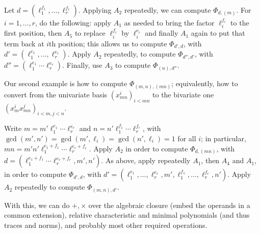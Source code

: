 \documentclass[12pt]{article}
\begin{document}
Let $d=(\ell_1^{f_1},\dots,\ell_r^{f_r})$. Applying $A_2$ repeatedly,
we can compute $\Phi_{d,(m)}$. For $i=1,\dots,r$, do the following:
apply $A_1$ as needed to bring the factor $\ell_i^{f_i}$ to the first
position, then $A_5$ to replace $\ell_i^{f_i}$ by $\ell_i^{e_i}$ and
finally $A_1$ again to put that term back at $i$th position; this
allows us to compute $\Phi_{d',d}$, with
$d'=(\ell_1^{e_1},\dots,\ell_r^{e_r})$.  Apply $A_2$ repeatedly, to
compute $\Phi_{d'',d'}$, with $d''=(\ell_1^{e_1}\cdots\ell_r^{e_r})$.
Finally, use $A_3$ to compute $\Phi_{(n),d''}$.

Our second example is how to compute $\Phi_{(m,n), (mn)}$;
equivalently, how to convert from the univariate basis $(x_{mn}^i)_{i
  < mn}$ to the bivariate one $(x_m^i x_{mn}^j)_{i < m, j < n}$.

Write $m = m' \ell_1^{e_1}\cdots \ell_r^{e_r}$ and $n = n'
\ell_1^{f_1}\cdots \ell_r^{f_r}$, with
$\gcd(m',n')=\gcd(m',\ell_i)=\gcd(n',\ell_i)=1$ for all $i$; in
particular, $mn = m' n' \ell_1^{e_1+f_1}\cdots \ell_r^{e_r+f_r}$.
Apply $A_2$ in order to compute $\Phi_{d,(mn)}$, with $d =
(\ell_1^{e_1+f_1}\cdots\ell_r^{e_r+f_r}, m', n')$. As above, apply
repeatedly $A_1$, then $A_4$ and $A_1$, in order to compute
$\Phi_{d',d}$, with $d'=(\ell_1^{e_1},\dots, \ell_r^{e_r},
m',\ell_1^{f_1},\dots,\ell_r^{f_r}, n')$. Apply $A_2$ repeatedly
to compute $\Phi_{(m,n),d'}$.

With this, we can do $+,\times$ over the algebraic closure (embed the
operands in a common extension), relative characteristic and minimal
polynomials (and thus traces and norms), and probably most other
required operations.


 
\end{document}
